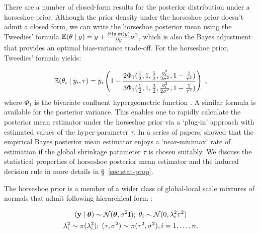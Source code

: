 \documentclass[sts,preprint]{imsart}
\begin{document}
There are a number of closed-form results for the posterior distribution under a horseshoe prior. Although the prior density under the horseshoe prior doesn't admit a closed form, we can write the horseshoe posterior mean using the Tweedies' formula $\mathbb E(\theta \mid y) = y + \frac{\partial \ln m(y)}{\partial y}\sigma^2$, which is also the Bayes adjustment that provides an optimal bias-variance trade-off. For the horseshoe prior, Tweedies' formula yields:

\begin{equation}
  \mathbb E(\theta_i \mid y_i, \tau) = y_i \left( 1 - \frac{2\Phi_1(\frac{1}{2}, 1,
  \frac{5}{2},\frac{y_i^2}{2\sigma^2}, 1-\frac{1}{\tau^2})}{
  3\Phi_1(\frac{1}{2}, 1, \frac{3}{2},\frac{y_i^2}{2\sigma^2}, 1-\frac{1}{\tau^2})} \right)
  \;,
\end{equation}
where $\Phi_1$ is the bivariate confluent hypergeometric function \citep{gordy1998computationally}. A similar formula is available for the posterior variance. This enables one to rapidly calculate the posterior mean estimator under the horseshoe prior via a `plug-in' approach with estimated values of the hyper-parameter $\tau$. In a series of papers, \citet{van2014horseshoe,van2015conditions,van2016many,van2017adaptive} showed that the empirical Bayes posterior mean estimator enjoys  a `near-minimax' rate of estimation if the global shrinkage parameter $\tau$ is chosen suitably. We discuss the statistical properties of horseshoe posterior mean estimator and the induced decision rule in more details in \S~\ref{sec:stat-prop}. 

%
The horseshoe prior is a member of a wider class of global-local scale mixtures of normals that admit following hierarchical form \citep{polson2010shrink}: 

\begin{gather*}
({\bf y} \mid \boldsymbol{\theta}) \sim {\cal N}(\boldsymbol{\theta}, \sigma^2 {\bf I}) ;\; \theta_i \sim {\cal N}(0, \lambda_i^2 \tau^2) \\
\lambda_i^2 \sim \pi(\lambda_i^2) ; \; (\tau,\sigma^2) \sim  \pi(\tau^2,\sigma^2), i = 1, \ldots, n. 
\end{gather*}
\end{document}
